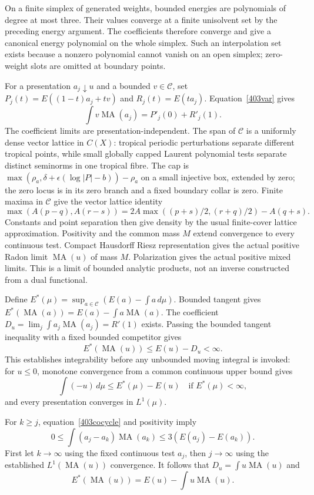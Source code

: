 \documentclass[11pt]{article}
\newcommand{\MA}{\operatorname{MA}}
\newcommand{\C}{\mathcal C}
\theoremstyle{remark}\newtheorem{remark}[theorem]{Remark}
\begin{document}
On a finite simplex of generated weights, bounded energies are
polynomials of degree at most three. Their values converge at a
finite unisolvent set by the preceding energy argument. The
coefficients therefore converge and give a canonical energy
polynomial on the whole simplex. Such an interpolation set exists
because a nonzero polynomial cannot vanish on an open simplex;
zero-weight slots are omitted at boundary points.

For a presentation $a_j\downarrow u$ and a bounded $v\in\C$,
set $P_j(t)=E((1-t)a_j+tv)$ and $R_j(t)=E(ta_j)$.
Equation~\eqref{403var} gives
\[
\int v\MA(a_j)=P'_j(0)+R'_j(1).
\]
The coefficient limits are presentation-independent. The span of
$\C$ is a uniformly dense vector lattice in $C(X)$: tropical
periodic perturbations separate different tropical points, while
small globally capped Laurent polynomial tests separate distinct
seminorms in one tropical fibre. The cap is
$\max(\rho_a,\delta+\epsilon(\log|P|-b))-\rho_a$ on a small
injective box, extended by zero; the zero locus is in its zero
branch and a fixed boundary collar is zero. Finite maxima in
$\C$ give the vector lattice identity
\[
\max(A(p-q),A(r-s))=
2A\max((p+s)/2,(r+q)/2)-A(q+s).
\]
Constants and point separation then give density by the usual
finite-cover lattice approximation. Positivity and the common
mass $M$ extend convergence to every continuous test. Compact
Hausdorff Riesz representation gives the actual positive Radon
limit $\MA(u)$ of mass $M$. Polarization gives the actual positive
mixed limits. This is a limit of bounded analytic products, not
an inverse constructed from a dual functional.

Define $E^*(\mu)=\sup_{a\in\C}(E(a)-\int a\,d\mu)$.
Bounded tangent gives $E^*(\MA(a))=E(a)-\int a\MA(a)$.
The coefficient $D_u=\lim_j\int a_j\MA(a_j)=R'(1)$ exists.
Passing the bounded tangent inequality with a fixed bounded
competitor gives
\[
E^*(\MA(u))\le E(u)-D_u<\infty.
\]
This establishes integrability before any unbounded moving
integral is invoked: for $u\le0$, monotone convergence from a
common continuous upper bound gives
\[
\int(-u)\,d\mu\le E^*(\mu)-E(u)
\quad\text{if }E^*(\mu)<\infty,
\]
and every presentation converges in $L^1(\mu)$.

For $k\ge j$, equation~\eqref{403cocycle} and positivity imply
\[
0\le\int(a_j-a_k)\MA(a_k)\le3(E(a_j)-E(a_k)).
\]
First let $k\to\infty$ using the fixed continuous test $a_j$,
then $j\to\infty$ using the established $L^1(\MA(u))$
convergence. It follows that $D_u=\int u\MA(u)$ and
\[
E^*(\MA(u))=E(u)-\int u\MA(u).
\]
\end{document}
